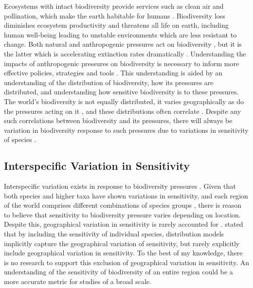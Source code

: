 \documentclass[11pt, a4paper, titlepage]{article}
\begin{document}
	Ecosystems with intact biodiversity provide services such as clean air and pollination, which make the earth habitable for humans \citep{leemans2003millennium}. Biodiversity loss diminishes ecosystem productivity \citep{duffy2017biodiversity} and threatens all life on earth, including human well-being \citep{diaz2006biodiversity} leading to unstable environments which are less resistant to change. Both natural and anthropogenic pressures act on biodiversity \citep{nobel2020anthropogenic}, but it is the latter which is accelerating extinction rates dramatically \citep{ceballos2015accelerated}. Understanding the impacts of anthropogenic pressures on biodiversity is necessary to inform more effective policies, strategies and tools \citep{diaz2006biodiversity, hansen2001global}. This understanding is aided by an understanding of the  distribution of biodiversity, how its pressures are distributed, and understanding how sensitive biodiversity is to these pressures. The world's biodiversity is not equally distributed, it varies geographically \citep{gaston2000global, ricklefs2004comprehensive, mcrae2017diversity}  as do the pressures acting on it \citep{millennium2005ecosystems, sala2000global, bowler2020mapping}, and these distributions often correlate \citep{ament2019compatibility, Velde2022}. Despite any such correlations between biodiversity and its pressures, there will always be variation in biodiversity response to such pressures due to variations in sensitivity of species \citep{bowler2020mapping}. 
	
   	\subsection*{Interspecific Variation in Sensitivity}
   	 Interspecific variation exists in response to biodiversity pressures \citep{foden2013identifying}. Given that both species and higher taxa \citep{sunday2015species} have shown variations in sensitivity, and each region of the world comprises different combinations of species groups \citep{goethem2021biodiversity}, there is reason to believe that sensitivity to biodiversity pressure varies depending on location. Despite this, geographical variation in sensitivity is rarely accounted for \citep{newbold2020tropical, sala2000global}. \citet{newbold2020tropical} stated that by including the sensitivity of individual species, distribution models implicitly capture the geographical variation of sensitivity, but rarely explicitly include geographical variation in sensitivity. To the best of my knowledge, there is no research to support this exclusion of geographical variation in sensitivity. An understanding of the sensitivity of biodiversity of an entire region could be a more accurate metric for studies of a broad scale. \newline
\end{document}
